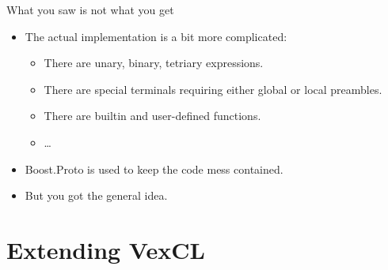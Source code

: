 \documentclass[@BEAMER_OPTIONS@]{beamer}
\begin{document}
\note{ }

\begin{frame}[fragile]{What you saw is not what you get}
    \begin{itemize}
        \item The actual implementation is a bit more complicated:
            \begin{itemize}
                \item There are unary, binary, tetriary expressions.
                \item There are special terminals requiring either global or
                    local preambles.
                \item There are builtin and user-defined functions.
                \item \ldots
            \end{itemize}
        \item Boost.Proto is used to keep the code mess contained.
            \vspace{\baselineskip}
        \item But you got the general idea.
    \end{itemize}
\end{frame}


\section{Extending VexCL}

\begin{frame}{}
    \tableofcontents[currentsection]
\end{frame}
\end{document}
